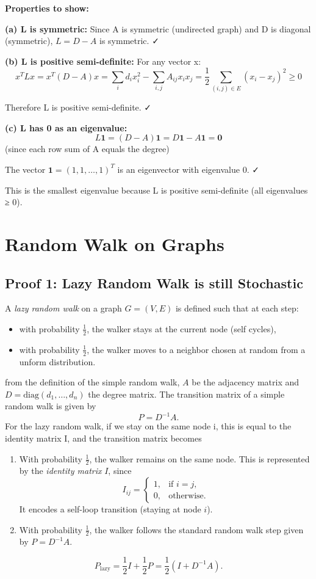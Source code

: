 \documentclass[12pt,a4paper]{article}
\begin{document}
\textbf{Properties to show:}

\textbf{(a) L is symmetric:}
Since A is symmetric (undirected graph) and D is diagonal (symmetric), $L = D - A$ is symmetric. ✓

\textbf{(b) L is positive semi-definite:}
For any vector x:
$$x^TLx = x^T(D-A)x = \sum_i d_i x_i^2 - \sum_{i,j} A_{ij} x_i x_j = \frac{1}{2}\sum_{(i,j) \in E} (x_i - x_j)^2 \geq 0$$

Therefore L is positive semi-definite. ✓

\textbf{(c) L has 0 as an eigenvalue:}
$$L\mathbf{1} = (D-A)\mathbf{1} = D\mathbf{1} - A\mathbf{1} = \mathbf{0}$$ (since each row sum of A equals the degree)

The vector $\mathbf{1} = (1,1,\ldots,1)^T$ is an eigenvector with eigenvalue 0. ✓

This is the smallest eigenvalue because L is positive semi-definite (all eigenvalues ≥ 0).
\section{Random Walk on Graphs}
\subsection{Proof 1: Lazy Random Walk is still Stochastic}

A \emph{lazy random walk} on a graph \( G = (V, E) \) is defined such that at each step:
\begin{itemize}
    \item with probability \( \frac{1}{2} \), the walker stays at the current node (self cycles),
    \item with probability \( \frac{1}{2} \), the walker moves to a neighbor chosen at random from a unform distribution.
\end{itemize}

from the definition of the simple random walk, \( A \) be the adjacency matrix and \( D = \mathrm{diag}(d_1, \dots, d_n) \) the degree matrix.  
The transition matrix of a simple random walk is given by
\[
P = D^{-1}A.
\]
For the lazy random walk, if we stay on the same node i, this is equal to the identity matrix I, and the transition matrix becomes


\begin{enumerate}
    \item With probability \( \tfrac{1}{2} \), the walker remains on the same node.
    This is represented by the \emph{identity matrix} \( I \), since
    \[
    I_{ij} =
    \begin{cases}
    1, & \text{if } i = j,\\[4pt]
    0, & \text{otherwise.}
    \end{cases}
    \]
    It encodes a self-loop transition (staying at node \( i \)).
    \item With probability \( \tfrac{1}{2} \), the walker follows the standard random walk step given by \( P = D^{-1}A \).
\end{enumerate}
\[
P_{\text{lazy}} = \frac{1}{2}I + \frac{1}{2}P = \frac{1}{2}\left(I + D^{-1}A\right).
\]
\end{document}
